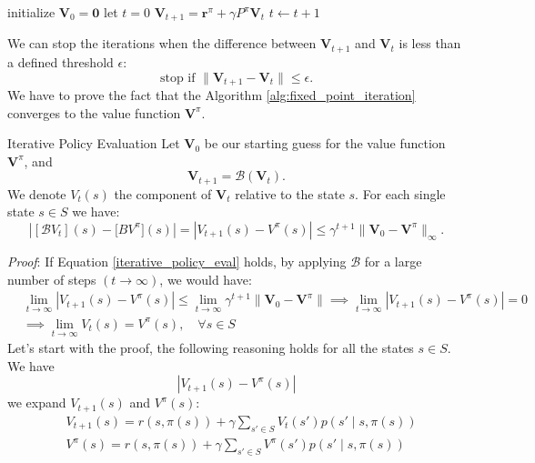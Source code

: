 \documentclass[10pt, a4paper]{report}
\begin{document}
\begin{algorithm}[H]
\caption{Fixed Point Iteration}\label{alg:fixed_point_iteration}
\begin{algorithmic}[1]
\State initialize $\mathbf V_0=\mathbf 0$ 
\State let $t=0$ 
\Do
\State $\mathbf V_{t+1}=\mathbf r^\pi+\gamma P^\pi\mathbf V_t$
\State $t\leftarrow t+1$
\end{algorithmic}
\end{algorithm}
\noindent We can stop the iterations when the difference between $\mathbf V_{t+1}$ and $\mathbf V_{t}$ is less than a defined threshold $\epsilon$:\begin{equation}
    \text{stop if }\|\mathbf V_{t+1}-\mathbf V_{t}\|\le\epsilon.
\end{equation}
We have to prove the fact that the Algorithm \ref{alg:fixed_point_iteration} converges to the value function $\mathbf V^\pi$.
\begin{boxtheorem}{Iterative Policy Evaluation}{}
    Let $\mathbf V_0$ be our starting guess for the value function $\mathbf V^\pi$, and\begin{equation}
        \mathbf V_{t+1}=\mathcal B ( \mathbf V_t).
    \end{equation}
    We denote $V_t(s)$ the component of $\mathbf V_t$ relative to the state $s$.
    For each single state $s\in S$ we have:\begin{equation}\label{iterative_policy_eval}
        |[\mathcal BV_t](s)-\mathcal [BV^\pi](s)|=|V_{t+1}(s)-V^\pi(s)|\le\gamma^{t+1}\|
        \mathbf V_0-\mathbf V^\pi\|_\infty.
    \end{equation}
\end{boxtheorem}
\noindent\textit{Proof}:
If Equation \eqref{iterative_policy_eval} holds, by applying $\mathcal B$ for a large number of steps $(t\rightarrow\infty)$, we would have:\begin{align}
    &\lim_{t\rightarrow\infty}|V_{t+1}(s)-V^\pi(s)|\le\lim_{t\rightarrow\infty}\gamma^{t+1}\|
        \mathbf V_0-\mathbf V^\pi\|\implies \lim_{t\rightarrow\infty} |V_{t+1}(s)-V^\pi(s)|=0\\ 
        &\implies  \lim_{t\rightarrow\infty}V_{t}(s)=V^\pi(s),\quad \forall s\in S
\end{align} 
Let's start with the proof, the following reasoning holds for all the states $s\in S$. We have \begin{equation}
    |V_{t+1}(s)-V^\pi(s)|
\end{equation}
we expand $V_{t+1}(s)$ and $V^\pi(s)$:\begin{align}
    &V_{t+1}(s)=r(s,\pi(s))+\gamma\sum_{s'\in S}V_t(s')p(s'\mid s,\pi(s))\\ 
    &V^\pi(s)=r(s,\pi(s))+\gamma\sum_{s'\in S}V^\pi(s')p(s'\mid s,\pi(s))
\end{align}
\end{document}
